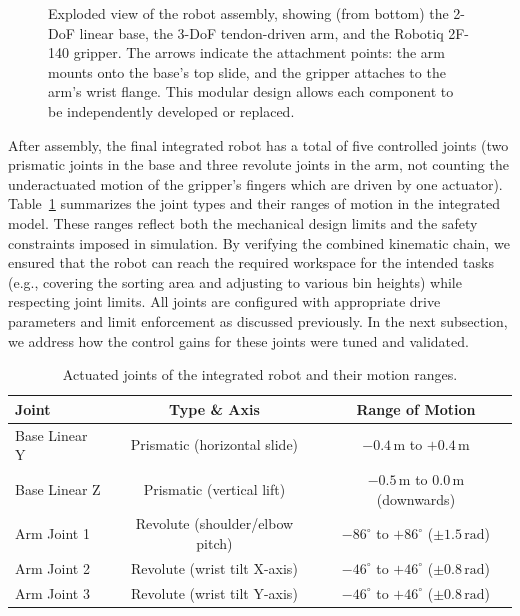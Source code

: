 \begin{figure}[htb]
\centering
{}
\caption[Exploded view of robot assembly]{Exploded view of the robot assembly, showing (from bottom) the 2-\acs{DoF} linear base, the 3-\acs{DoF} tendon-driven arm, and the Robotiq 2F-140 gripper. The arrows indicate the attachment points: the arm mounts onto the base's top slide, and the gripper attaches to the arm's wrist flange. This modular design allows each component to be independently developed or replaced.}\label{fig:robot-exploded}
\end{figure}

After assembly, the final integrated robot has a total of five controlled joints (two prismatic joints in the base and three revolute joints in the arm, not counting the underactuated motion of the gripper's fingers which are driven by one actuator). Table~\ref{tab:joint-limits} summarizes the joint types and their ranges of motion in the integrated model. These ranges reflect both the mechanical design limits and the safety constraints imposed in simulation. By verifying the combined kinematic chain, we ensured that the robot can reach the required workspace for the intended tasks (e.g., covering the sorting area and adjusting to various bin heights) while respecting joint limits. All joints are configured with appropriate drive parameters and limit enforcement as discussed previously. In the next subsection, we address how the control gains for these joints were tuned and validated.

\begin{table}[htb]
    \centering
    \caption{Actuated joints of the integrated robot and their motion ranges.}\label{tab:joint-limits}
    \begin{tabular}{l c c}
    \hline
    \textbf{Joint} & \textbf{Type \& Axis} & \textbf{Range of Motion} \\
    \hline
    Base Linear Y & Prismatic (horizontal slide)    & $-0.4\,\mathrm{m}$ to $+0.4\,\mathrm{m}$ \\
    Base Linear Z & Prismatic (vertical lift)       & $-0.5\,\mathrm{m}$ to $0.0\,\mathrm{m}$ (downwards) \\
    Arm Joint 1   & Revolute (shoulder/elbow pitch) & $-86^\circ$ to $+86^\circ$ ($\pm 1.5\,\mathrm{rad}$) \\
    Arm Joint 2   & Revolute (wrist tilt X-axis)    & $-46^\circ$ to $+46^\circ$ ($\pm 0.8\,\mathrm{rad}$) \\
    Arm Joint 3   & Revolute (wrist tilt Y-axis)    & $-46^\circ$ to $+46^\circ$ ($\pm 0.8\,\mathrm{rad}$) \\
    \hline
    \end{tabular}
\end{table}

